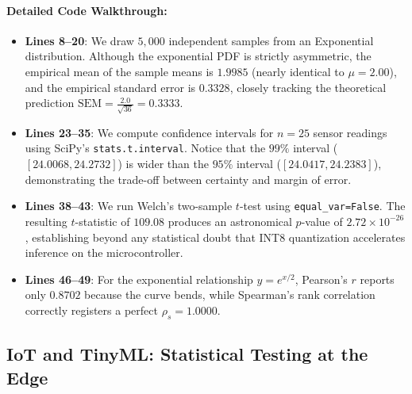 \paragraph{Detailed Code Walkthrough:}
\begin{itemize}
    \item \textbf{Lines 8--20}: We draw $5{,}000$ independent samples from an Exponential distribution. Although the exponential PDF is strictly asymmetric, the empirical mean of the sample means is $1.9985$ (nearly identical to $\mu = 2.00$), and the empirical standard error is $0.3328$, closely tracking the theoretical prediction $\text{SEM} = \frac{2.0}{\sqrt{36}} = 0.3333$.
    \item \textbf{Lines 23--35}: We compute confidence intervals for $n = 25$ sensor readings using SciPy's \texttt{stats.t.interval}. Notice that the $99\%$ interval ($[24.0068, 24.2732]$) is wider than the $95\%$ interval ($[24.0417, 24.2383]$), demonstrating the trade-off between certainty and margin of error.
    \item \textbf{Lines 38--43}: We run Welch's two-sample $t$-test using \texttt{equal\_var=False}. The resulting $t$-statistic of $109.08$ produces an astronomical $p$-value of $2.72 \times 10^{-26}$, establishing beyond any statistical doubt that INT8 quantization accelerates inference on the microcontroller.
    \item \textbf{Lines 46--49}: For the exponential relationship $y = e^{x/2}$, Pearson's $r$ reports only $0.8702$ because the curve bends, while Spearman's rank correlation correctly registers a perfect $\rho_s = 1.0000$.
\end{itemize}

\subsection{IoT and TinyML: Statistical Testing at the Edge}\label{subsec:stat_iot}

